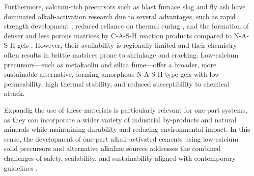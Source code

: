 Furthermore, calcium-rich precursors such as blast furnace slag and fly ash have dominated alkali-activation research due to several advantages, such as rapid strength development \cite{provis2014geopolymers}, reduced reliance on thermal curing \cite{ke2021one}, and the formation of denser and less porous matrices by C-A-S-H reaction products compared to N-A-S-H gels \cite{bernal2014engineering}.
However, their availability is regionally limited and their chemistry often results in brittle matrices prone to shrinkage and cracking. Low-calcium precursors—such as metakaolin and silica fume—offer a broader, more sustainable alternative, forming amorphous N-A-S-H type gels with low permeability, high thermal stability, and reduced susceptibility to chemical attack.

Expandig the use of these materials is particularly relevant for one-part systems, as they can incorporate a wider variety of industrial by-products and natural minerals while maintaining durability and reducing environmental impact.
In this sense, the development of one-part alkali-activated cements using low-calcium solid precursors and alternative alkaline sources addresses the combined challenges of safety, scalability, and sustainability aligned with contemporary guidelines \cite{PNRS2016}.